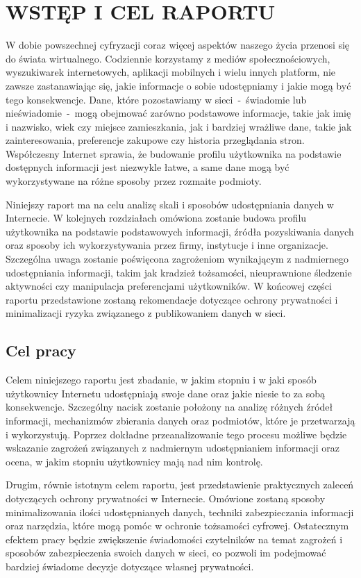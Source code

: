 \chapter{WSTĘP I CEL RAPORTU}
\label{chap:introduction}
W dobie powszechnej cyfryzacji coraz więcej aspektów naszego życia przenosi się do świata wirtualnego. 
Codziennie korzystamy z mediów społecznościowych, wyszukiwarek internetowych, aplikacji mobilnych i wielu innych platform, 
nie zawsze zastanawiając się, jakie informacje o sobie udostępniamy i jakie mogą być tego konsekwencje. 
Dane, które pozostawiamy w sieci~-~świadomie lub nieświadomie~-~mogą obejmować zarówno podstawowe informacje, 
takie jak imię i nazwisko, wiek czy miejsce zamieszkania, jak i bardziej wrażliwe dane, takie jak zainteresowania, 
preferencje zakupowe czy historia przeglądania stron. 
Współczesny Internet sprawia, że budowanie profilu użytkownika na podstawie dostępnych informacji jest niezwykle łatwe, 
a same dane mogą być wykorzystywane na różne sposoby przez rozmaite podmioty.

Niniejszy raport ma na celu analizę skali i sposobów udostępniania danych w Internecie. 
W kolejnych rozdziałach omówiona zostanie budowa profilu użytkownika na podstawie podstawowych informacji, 
źródła pozyskiwania danych oraz sposoby ich wykorzystywania przez firmy, instytucje i inne organizacje. 
Szczególna uwaga zostanie poświęcona zagrożeniom wynikającym z nadmiernego udostępniania informacji, takim jak kradzież tożsamości, 
nieuprawnione śledzenie aktywności czy manipulacja preferencjami użytkowników. 
W końcowej części raportu przedstawione zostaną rekomendacje dotyczące ochrony prywatności 
i minimalizacji ryzyka związanego z publikowaniem danych w sieci.
\section{Cel pracy}
Celem niniejszego raportu jest zbadanie, w jakim stopniu i w jaki sposób użytkownicy Internetu udostępniają swoje dane oraz jakie niesie to za sobą konsekwencje. 
Szczególny nacisk zostanie położony na analizę różnych źródeł informacji, mechanizmów zbierania danych oraz podmiotów, które je przetwarzają i wykorzystują.
Poprzez dokładne przeanalizowanie tego procesu możliwe będzie wskazanie zagrożeń związanych z nadmiernym udostępnianiem informacji oraz ocena, 
w jakim stopniu użytkownicy mają nad nim kontrolę.

Drugim, równie istotnym celem raportu, jest przedstawienie praktycznych zaleceń dotyczących ochrony prywatności w Internecie. 
Omówione zostaną sposoby minimalizowania ilości udostępnianych danych, techniki zabezpieczania informacji oraz narzędzia, 
które mogą pomóc w ochronie tożsamości cyfrowej. Ostatecznym efektem pracy będzie zwiększenie świadomości czytelników na temat zagrożeń i sposobów 
zabezpieczenia swoich danych w sieci, co pozwoli im podejmować bardziej świadome decyzje dotyczące własnej prywatności.

